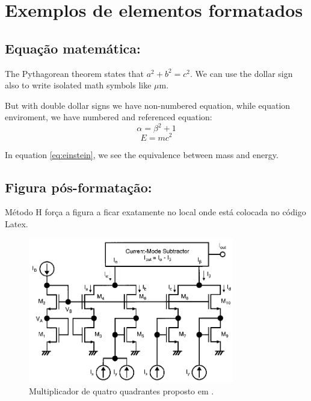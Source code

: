 \chapter*{Exemplos de elementos formatados}

\section*{Equa\c{c}\~ao matemática:}

The Pythagorean theorem states that $a^2 + b^2 = c^2$. We can use the dollar sign also to write isolated math symbols like $\mu$m.

But with double dollar signs we have non-numbered equation, while equation enviroment, we have numbered and referenced equation:
$$ \alpha = \beta^2 + 1 $$
\begin{equation}
  \label{eq:einstein}
  E = mc^2
\end{equation}

In equation \eqref{eq:einstein}, we see the equivalence between mass and energy.

\section*{Figura pós-formata\c{c}\~ao:}
Método H for\c{c}a a figura a ficar exatamente no local onde está colocada no código Latex.
\begin{figure}[H]
    \centering
    \includegraphics[width=0.8\textwidth]{figures/tanno_multiplier.png}
    \caption{\small Multiplicador de quatro quadrantes proposto em \cite{nunes2023}.\normalsize}
    \label{fig_tanno}
\end{figure}

